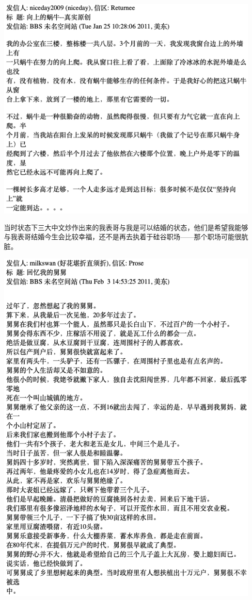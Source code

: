 \documentclass[9pt, b5paper]{article}
\begin{document}
\begin{center}
\includegraphics[width=.9\linewidth]{./pic/readme_20210520_095054.png}
\end{center}

当时状态下三大中文炒作出来的我表哥与我是可以结婚的状态，他们是希望我能够与我表哥结婚今生会比较幸福，还不是再去执着于硅谷职场——那个职场可能很肮脏。

\begin{center}
\includegraphics[width=.9\linewidth]{./pic/readme_20210520_095645.png}
\end{center}
\end{document}
